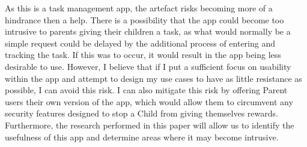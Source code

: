 As this is a task management app, the artefact risks becoming more of a hindrance then a help.
There is a possibility that the app could become too intrusive to parents giving their children a task, as what would normally be a simple request could be delayed by the additional process of entering and tracking the task.
If this was to occur, it would result in the app being less desirable to use.
However, I believe that if I put a sufficient focus on usability within the app and attempt to design my use cases to have as little resistance as possible, I can avoid this risk.
I can also mitigate this risk by offering Parent users their own version of the app, which would allow them to circumvent any security features designed to stop a Child from giving themselves rewards.
Furthermore, the research performed in this paper will allow us to identify the usefulness of this app and determine areas where it may become intrusive.